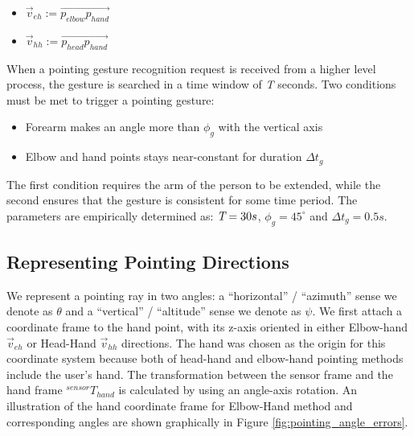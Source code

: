 \begin{itemize}
\item{$\vec{v}_{eh} := \vec{p_{elbow}p_{hand}}$}
\item{$\vec{v}_{hh} := \vec{p_{head}p_{hand}}$}
\end{itemize}


When a pointing gesture recognition request is received from a higher level process, the gesture is searched in a time window of \emph{T} seconds. Two conditions must be met to trigger a pointing gesture:

\begin{itemize}
  \item Forearm makes an angle more than $\phi_{g}$ with the vertical axis
  \item Elbow and hand points stays near-constant for duration $\Delta t_{g}$
\end{itemize}

The first condition requires the arm of the person to be extended, while the second ensures that the gesture is consistent for some time period. The parameters are empirically determined as: $\emph{T}=30s$, $\phi_{g}=45^{\circ}$ and $\Delta t_{g}=0.5s$.

\subsection{Representing Pointing Directions}
\label{sec:pointing_representing_pointing_directions}

We represent a pointing ray in two angles: a ``horizontal'' / ``azimuth'' sense we denote as $\theta$ and a ``vertical'' / ``altitude'' sense we denote as $\psi$. We first attach a coordinate frame to the hand point, with its z-axis oriented in either Elbow-hand $\vec{v}_{eh}$ or Head-Hand $\vec{v}_{hh}$ directions. The hand was chosen as the origin for this coordinate system because both of head-hand and elbow-hand pointing methods include the user's hand. The transformation between the sensor frame and the hand frame $^{sensor}T_{hand}$ is calculated by using an angle-axis rotation. An illustration of the hand coordinate frame for Elbow-Hand method and corresponding angles are shown graphically in Figure \ref{fig:pointing_angle_errors}.

